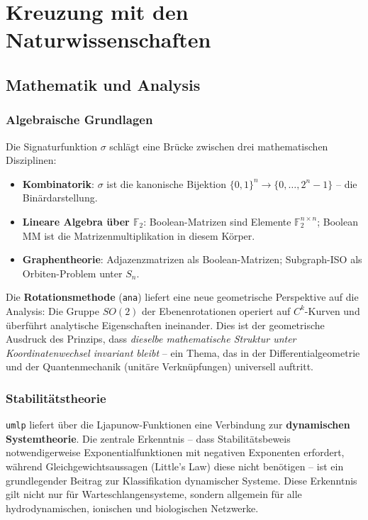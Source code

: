 ﻿\documentclass[a4paper,12pt]{scrreprt}
\theoremstyle{definition}
\begin{document}
\section{Kreuzung mit den Naturwissenschaften}
\label{sec:cross_science}

\subsection{Mathematik und Analysis}

\subsubsection{Algebraische Grundlagen}

Die Signaturfunktion $\sigma$ schlägt eine Brücke zwischen drei
mathematischen Disziplinen:

\begin{itemize}
  \item \textbf{Kombinatorik}: $\sigma$ ist die kanonische Bijektion
    $\{0,1\}^n \to \{0, \ldots, 2^n-1\}$ -- die Binärdarstellung.
  \item \textbf{Lineare Algebra über $\mathbb{F}_2$}: Boolean-Matrizen
    sind Elemente $\mathbb{F}_2^{n \times n}$; Boolean MM ist die
    Matrizenmultiplikation in diesem Körper.
  \item \textbf{Graphentheorie}: Adjazenzmatrizen als Boolean-Matrizen;
    Subgraph-ISO als Orbiten-Problem unter $S_n$.
\end{itemize}

Die \textbf{Rotationsmethode} (\texttt{ana}) liefert eine neue geometrische
Perspektive auf die Analysis: Die Gruppe $SO(2)$ der Ebenenrotationen
operiert auf $C^k$-Kurven und überführt analytische Eigenschaften ineinander.
Dies ist der geometrische Ausdruck des Prinzips, dass \emph{dieselbe
mathematische Struktur unter Koordinatenwechsel invariant bleibt} --
ein Thema, das in der Differentialgeometrie und der Quantenmechanik
(unitäre Verknüpfungen) universell auftritt.

\subsubsection{Stabilitätstheorie}

\texttt{umlp} liefert über die Ljapunow-Funktionen eine Verbindung zur
\textbf{dynamischen Systemtheorie}. Die zentrale Erkenntnis -- dass
Stabilitätsbeweis notwendigerweise Exponentialfunktionen mit negativen
Exponenten erfordert, während Gleichgewichtsaussagen (Little's Law) diese
nicht benötigen -- ist ein grundlegender Beitrag zur Klassifikation
dynamischer Systeme. Diese Erkenntnis gilt nicht nur für Warteschlangensysteme,
sondern allgemein für alle hydrodynamischen, ionischen und biologischen
Netzwerke.
\end{document}
